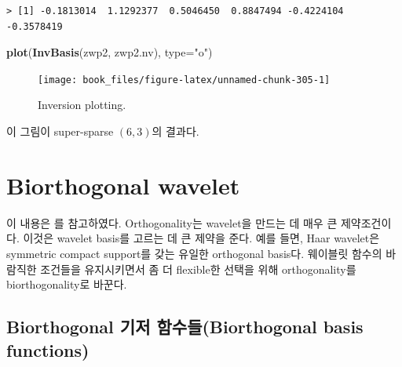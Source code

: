 \documentclass[b5paper,]{scrbook}
\makeatletter
\newenvironment{Shaded}{\begin{snugshade}}{\end{snugshade}}
\newcommand{\DataTypeTok}[1]{\textcolor[rgb]{0.13,0.29,0.53}{#1}}
\newcommand{\KeywordTok}[1]{\textcolor[rgb]{0.13,0.29,0.53}{\textbf{#1}}}
\newcommand{\NormalTok}[1]{#1}
\newcommand{\StringTok}[1]{\textcolor[rgb]{0.31,0.60,0.02}{#1}}
\theoremstyle{plain}
\theoremstyle{definition}
\numberwithin{equation}{section}
\newenvironment{kframe}{%
\medskip{}
\setlength{\fboxsep}{.8em}
 \def\at@end@of@kframe{}%
 \ifinner\ifhmode%
  \def\at@end@of@kframe{\end{minipage}}%
  \begin{minipage}{\columnwidth}%
 \fi\fi%
 \def\FrameCommand##1{\hskip\@totalleftmargin \hskip-\fboxsep
 \colorbox{shadecolor}{##1}\hskip-\fboxsep
     \hskip-\linewidth \hskip-\@totalleftmargin \hskip\columnwidth}%
 \MakeFramed {\advance\hsize-\width
   \@totalleftmargin\z@ \linewidth\hsize
   \@setminipage}}%
 {\par\unskip\endMakeFramed%
 \at@end@of@kframe}
\renewenvironment{Shaded}{\begin{kframe}}{\end{kframe}}
\makeatother
\begin{document}
\begin{verbatim}
> [1] -0.1813014  1.1292377  0.5046450  0.8847494 -0.4224104 -0.3578419
\end{verbatim}

\begin{Shaded}
\begin{Highlighting}[]
\KeywordTok{plot}\NormalTok{(}\KeywordTok{InvBasis}\NormalTok{(zwp2, zwp2.nv), }\DataTypeTok{type=}\StringTok{"o"}\NormalTok{)}
\end{Highlighting}
\end{Shaded}

\begin{figure}

{\centering \texttt{[image: book\_files/figure-latex/unnamed-chunk-305-1]} 

}

\caption{Inversion plotting.}\label{fig:unnamed-chunk-305}
\end{figure}

이 그림이 super-sparse \((6,3)\)의 결과다.

\hypertarget{biorthogonal-wavelet}{%
\section{Biorthogonal wavelet}\label{biorthogonal-wavelet}}

이 내용은 \citep{Gomes2015}를 참고하였다. Orthogonality는 wavelet을 만드는 데 매우 큰 제약조건이다. 이것은 wavelet basis를 고르는 데 큰 제약을 준다. 예를 들면, Haar wavelet은 symmetric compact support를 갖는 유일한 orthogonal basis다. 웨이블릿 함수의 바람직한 조건들을 유지시키면서 좀 더 flexible한 선택을 위해 orthogonality를 biorthogonality로 바꾼다.

\hypertarget{biorthogonal--biorthogonal-basis-functions}{%
\subsection{Biorthogonal 기저 함수들(Biorthogonal basis functions)}\label{biorthogonal--biorthogonal-basis-functions}}
\end{document}
